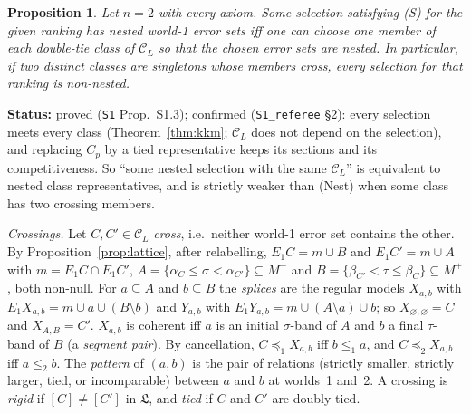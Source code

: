 \documentclass[11pt]{article}
\newtheorem{proposition}[theorem]{Proposition}
\theoremstyle{definition}
\theoremstyle{remark}
\newcommand{\C}{\mathcal C}
\newcommand{\src}[1]{\texttt{#1}}
\newcommand{\status}[1]{\par\smallskip\noindent\textbf{Status:} #1\par\smallskip}
\begin{document}
\begin{proposition}\label{prop:S13}
Let $n=2$ with every axiom. Some selection satisfying (S) for the given ranking has nested world-1 error sets iff one can choose one member of each double-tie class of $\C_L$ so that the chosen error sets are nested. In particular, if two distinct classes are singletons whose members cross, every selection for that ranking is non-nested.
\end{proposition}
\status{proved (\src{S1} Prop.~S1.3); confirmed (\src{S1\_referee} \S2): every selection meets every class (Theorem~\ref{thm:kkm}; $\C_L$ does not depend on the selection), and replacing $C_p$ by a tied representative keeps its sections and its competitiveness. So ``some nested selection with the same $\C_L$'' is equivalent to nested class representatives, and is strictly weaker than (Nest) when some class has two crossing members.}

\emph{Crossings.} Let $C,C'\in\C_L$ \emph{cross}, i.e.\ neither world-1 error set contains the other. By Proposition~\ref{prop:lattice}, after relabelling, $E_1C=m\cup B$ and $E_1C'=m\cup A$ with $m=E_1C\cap E_1C'$, $A=\{\alpha_C\le\sigma<\alpha_{C'}\}\subseteq M^-$ and $B=\{\beta_{C'}<\tau\le\beta_C\}\subseteq M^+$, both non-null. For $a\subseteq A$ and $b\subseteq B$ the \emph{splices} are the regular models $X_{a,b}$ with $E_1X_{a,b}=m\cup a\cup(B\setminus b)$ and $Y_{a,b}$ with $E_1Y_{a,b}=m\cup(A\setminus a)\cup b$; so $X_{\varnothing,\varnothing}=C$ and $X_{A,B}=C'$. $X_{a,b}$ is coherent iff $a$ is an initial $\sigma$-band of $A$ and $b$ a final $\tau$-band of $B$ (a \emph{segment pair}). By cancellation, $C\preceq_1X_{a,b}$ iff $b\le_1a$, and $C\preceq_2X_{a,b}$ iff $a\le_2b$. The \emph{pattern} of $(a,b)$ is the pair of relations (strictly smaller, strictly larger, tied, or incomparable) between $a$ and $b$ at worlds~1 and~2. A crossing is \emph{rigid} if $[C]\ne[C']$ in $\mathfrak L$, and \emph{tied} if $C$ and $C'$ are doubly tied.
\end{document}

